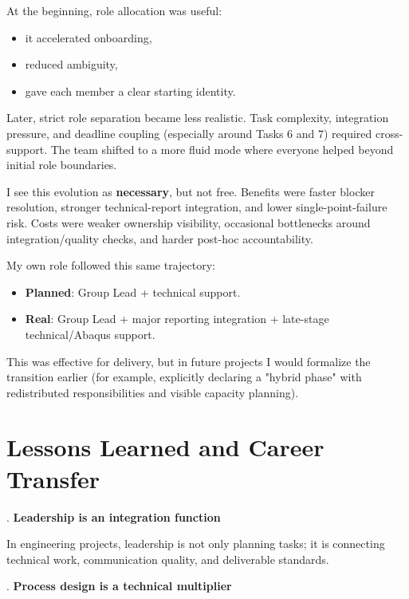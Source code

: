 \noindent At the beginning, role allocation was useful:

\begin{itemize}[leftmargin=1.5em]
\item it accelerated onboarding,
\item reduced ambiguity,
\item gave each member a clear starting identity.
\end{itemize}

\noindent Later, strict role separation became less realistic. Task complexity, integration pressure, and deadline coupling (especially around Tasks 6 and 7) required cross-support. The team shifted to a more fluid mode where everyone helped beyond initial role boundaries.


\noindent I see this evolution as \textbf{necessary}, but not free. Benefits were faster blocker resolution, stronger technical-report integration, and lower single-point-failure risk. Costs were weaker ownership visibility, occasional bottlenecks around integration/quality checks, and harder post-hoc accountability.


\noindent My own role followed this same trajectory:

\begin{itemize}[leftmargin=1.5em]
\item \textbf{Planned}: Group Lead + technical support.
\item \textbf{Real}: Group Lead + major reporting integration + late-stage technical/Abaqus support.
\end{itemize}

\noindent This was effective for delivery, but in future projects I would formalize the transition earlier (for example, explicitly declaring a "hybrid phase" with redistributed responsibilities and visible capacity planning).


\chapter{Lessons Learned and Career Transfer}


. \textbf{Leadership is an integration function}

\noindent In engineering projects, leadership is not only planning tasks; it is connecting technical work, communication quality, and deliverable standards.


. \textbf{Process design is a technical multiplier}

